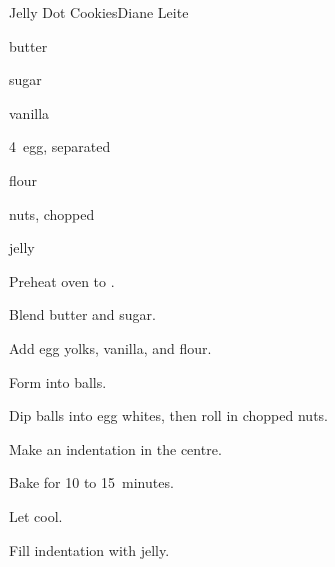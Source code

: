 \begin{recipe}{Jelly Dot Cookies}{Diane Leite}{}

\begin{ingredients}
\item {} butter
\item {} sugar
\item {} vanilla
\item 4~egg, separated
\item {} flour
\item nuts, chopped
\item jelly
\end{ingredients}

\begin{directions}
\item Preheat oven to .
\item Blend butter and sugar.
\item Add egg yolks, vanilla, and flour.
\item Form into balls.
\item Dip balls into egg whites, then roll in chopped nuts.
\item Make an indentation in the centre.
\item Bake for 10 to 15~minutes.
\item Let cool.
\item Fill indentation with jelly.
\end{directions}

\hint{}
\end{recipe}
